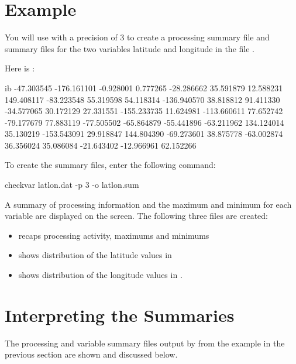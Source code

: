 \section{Example}

You will use  with a precision of 3 to create a
processing summary file and summary files for the two variables
latitude and longitude in the file .

Here is :

\begin{vcode}{ib}
-47.303545 -176.161101
 -0.928001    0.777265
-28.286662   35.591879
 12.588231  149.408117
-83.223548   55.319598
 54.118314 -136.940570
 38.818812   91.411330
-34.577065   30.172129
 27.331551 -155.233735
 11.624981 -113.660611
 77.652742  -79.177679
 77.883119  -77.505502
-65.864879  -55.441896
-63.211962  134.124014
 35.130219 -153.543091
 29.918847  144.804390
-69.273601   38.875778
-63.002874   36.356024
 35.086084  -21.643402
-12.966961   62.152266 
\end{vcode}

To create the summary files, enter the following command: 

\begin{example}
checkvar latlon.dat -p 3 -o latlon.sum 
\end{example}

A summary of processing information and the maximum and minimum for
each variable are displayed on the screen. The following three files
are created:

\begin{itemize}
\item {} recaps processing activity, maximums and minimums 
  
\item {} shows distribution of the latitude values in
  
\item {} shows distribution of the longitude values
  in .
\end{itemize}

\section{Interpreting the Summaries}

The processing and variable summary files output by 
from the example in the previous section are shown and discussed
below.

